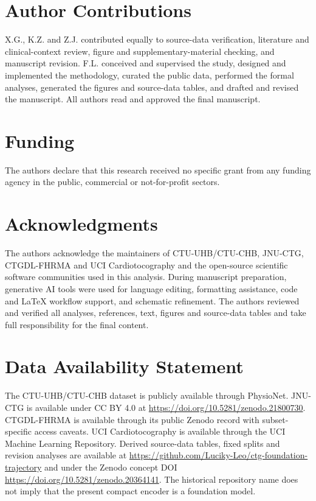 \documentclass[utf8]{FrontiersinHarvard}
\begin{document}
\section*{Author Contributions}
X.G., K.Z. and Z.J. contributed equally to source-data verification, literature and clinical-context review, figure and supplementary-material checking, and manuscript revision. F.L. conceived and supervised the study, designed and implemented the methodology, curated the public data, performed the formal analyses, generated the figures and source-data tables, and drafted and revised the manuscript. All authors read and approved the final manuscript.

\section*{Funding}
The authors declare that this research received no specific grant from any funding agency in the public, commercial or not-for-profit sectors.

\section*{Acknowledgments}
The authors acknowledge the maintainers of CTU-UHB/CTU-CHB, JNU-CTG, CTGDL-FHRMA and UCI Cardiotocography and the open-source scientific software communities used in this analysis. During manuscript preparation, generative AI tools were used for language editing, formatting assistance, code and LaTeX workflow support, and schematic refinement. The authors reviewed and verified all analyses, references, text, figures and source-data tables and take full responsibility for the final content.

\section*{Data Availability Statement}
The CTU-UHB/CTU-CHB dataset is publicly available through PhysioNet. JNU-CTG is available under CC BY 4.0 at \url{https://doi.org/10.5281/zenodo.21800730}. CTGDL-FHRMA is available through its public Zenodo record with subset-specific access caveats. UCI Cardiotocography is available through the UCI Machine Learning Repository. Derived source-data tables, fixed splits and revision analyses are available at \url{https://github.com/Luciky-Leo/ctg-foundation-trajectory} and under the Zenodo concept DOI \url{https://doi.org/10.5281/zenodo.20364141}. The historical repository name does not imply that the present compact encoder is a foundation model.

\setlength{\bibsep}{0pt}


\end{document}
